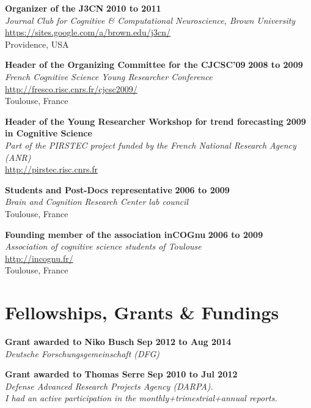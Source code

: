\documentclass[margin,line]{resume}
\begin{document}
\begin{resume}
	\textbf{Organizer of the J3CN} \hfill \textbf{2010 to 2011}\\
	\textsl{Journal Club for Cognitive \& Computational Neuroscience, Brown University}\\
	 \url{https://sites.google.com/a/brown.edu/j3cn/}\\
	Providence, USA	

	\textbf{Header of the Organizing Committee for the CJCSC'09} \hfill \textbf{2008 to 2009}\\
	\textsl{French Cognitive Science Young Researcher Conference}\\
	 \url{http://fresco.risc.cnrs.fr/cjcsc2009/}\\
	Toulouse, France		

	\textbf{Header of the Young Researcher Workshop for trend forecasting} \hfill \textbf{2009}\\
	 \textbf{in Cognitive Science}\\
	\textsl{Part of the PIRSTEC project funded by the French National Research Agency (ANR)}\\
	 \url{http://pirstec.risc.cnrs.fr}

	\textbf{Students and Post-Docs representative} \hfill \textbf{2006 to 2009}\\
	\textsl{Brain and Cognition Research Center lab council}\\
	Toulouse, France	

	\textbf{Founding member of the association inCOGnu} \hfill \textbf{2006 to 2009}\\
	\textsl{Association of cognitive science students of Toulouse}\\
	 \url{http://incognu.fr/}\\
	Toulouse, France


	\vspace{3mm}
	\section{\mysidestyle Fellowships, Grants \& Fundings}

	\textbf{Grant awarded to Niko Busch} \hfill \textbf{Sep 2012 to Aug 2014}\\
	\textsl{Deutsche Forschungsgemeinschaft (DFG)}

	\textbf{Grant awarded to Thomas Serre} \hfill \textbf{Sep 2010 to Jul 2012}\\
	\textsl{Defense Advanced Research Projects Agency (DARPA).\\ I had an active participation in the monthly+trimestrial+annual reports.}
	

\end{resume}
\end{document}

